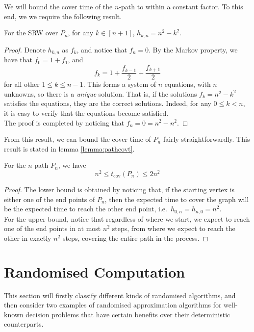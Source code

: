 	We will bound the cover time of the $n$-path to within a constant factor. To this end, we 
	we require the following result.
	\begin{claim}
		For the SRW over $P_n$, for any $k \in [n+1]$, $h_{k,n} = n^2-k^2$.
	\end{claim}
	\begin{proof}
		Denote $h_{k,n}$ as $f_k$, and notice that $f_n = 0$. By the Markov property, we
		have that $f_0 = 1 + f_1$, and 
		$$
			f_k = 1 + \frac{f_{k-1}}{2} + \frac{f_{k+1}}{2}
		$$
		for all other $1 \leq k \leq n-1$. This forms a system of $n$ equations, with $n$ 
		unknowns, so there is a \emph{unique} solution. That is, if the solutions 
		$f_k = n^2-k^2$ satisfies the equations, they are the correct solutions. Indeed,
		for any $0 \leq k < n$, it is easy to verify that the equations become satisfied.
		\\
		The proof is completed by noticing that $f_n = 0 = n^2-n^2$.
	\end{proof}

	From this result, we can bound the cover time of $P_n$ fairly straightforwardly. This 
	result is stated in lemma \ref{lemma:pathcovt}.
	\begin{lemma}
		\label{lemma:pathcovt}
		For the $n$-path $P_n$, we have 
		$$
			n^2 \leq t_\mathrm{cov}(P_n) \leq 2n^2
		$$
	\end{lemma}
	\begin{proof}
		The lower bound is obtained by noticing that, if the starting vertex is either one 
		of the end points of $P_n$, then the expected time to cover the graph will be the 
		expected time to reach the other end point, i.e.\ $h_{0,n} = h_{n,0} = n^2$. \\
		For the upper bound, notice that regardless of where we start, we expect to reach 
		one of the end points in at most $n^2$ steps, from where we expect to reach the 
		other in exactly $n^2$ steps, covering the entire path in the process.
	\end{proof}

\section{Randomised Computation}
	This section will firstly classify different kinds of randomised algorithms, and then 
	consider two examples of randomised approximation algorithms for well-known decision 
	problems that have certain benefits over their deterministic counterparts.

